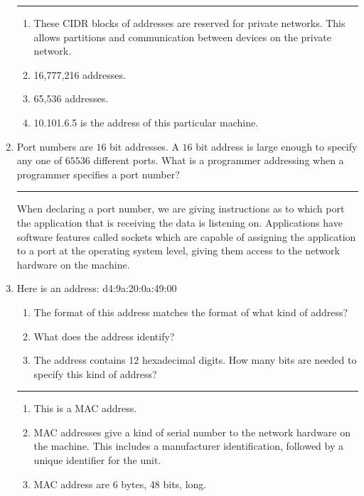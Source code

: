 \documentclass[twoside]{article}
\newenvironment{answer}
  {\vspace*{0.2cm} \rule{12cm}{0.04cm} \vspace*{0.2cm}}
  {\vspace*{0.2cm}}
\begin{document}
\begin{enumerate}
  \begin{answer}

  \begin{enumerate}
    \item These CIDR blocks of addresses are reserved for private networks.  This allows partitions and communication between devices on the private network.
    \item 16,777,216 addresses.
    \item 65,536 addresses.
    \item 10.101.6.5 is the address of this particular machine.
    \end{enumerate}

    \end{answer}

  \item Port numbers are $16$ bit addresses. A $16$ bit address is large
    enough to specify any one of $65536$ different ports. What is a programmer
    addressing when a programmer specifies a port number?

  \begin{answer}
    When declaring a port number, we are giving instructions as to which port the application that is receiving the data is listening on.  Applications have software features called sockets which 
   are capable of assigning the application to a port at the operating system level, giving them access to the network hardware on the machine.
    \end{answer}

  \item Here is an address: d4:9a:20:0a:49:00
  \begin{enumerate}
    \item The format of this address matches the format of what kind of address?
    \item What does the address identify?
    \item The address contains 12 hexadecimal digits. How many bits are needed
      to specify this kind of address?
    \end{enumerate}
  
  \begin{answer}

  \begin{enumerate}
    \item This is a MAC address.
    \item MAC addresses give a kind of serial number to the network hardware on the machine.  This includes a manufacturer identification, followed by a unique identifier for the unit.
    \item MAC address are 6 bytes, 48 bits, long.
    \end{enumerate}


\end{answer}
\end{enumerate}
\end{document}
